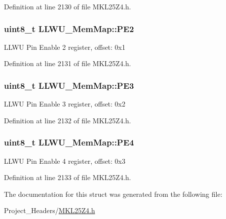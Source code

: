 Definition at line 2130 of file M\+K\+L25\+Z4.\+h.

\subsubsection[{\texorpdfstring{P\+E2}{PE2}}]{\setlength{\rightskip}{0pt plus 5cm}uint8\+\_\+t L\+L\+W\+U\+\_\+\+Mem\+Map\+::\+P\+E2}\hypertarget{struct_l_l_w_u___mem_map_a53d86f5153bce17f9927472da4fade5a}{}\label{struct_l_l_w_u___mem_map_a53d86f5153bce17f9927472da4fade5a}
L\+L\+WU Pin Enable 2 register, offset\+: 0x1 

Definition at line 2131 of file M\+K\+L25\+Z4.\+h.

\subsubsection[{\texorpdfstring{P\+E3}{PE3}}]{\setlength{\rightskip}{0pt plus 5cm}uint8\+\_\+t L\+L\+W\+U\+\_\+\+Mem\+Map\+::\+P\+E3}\hypertarget{struct_l_l_w_u___mem_map_a96a722e1ae66ee87b88407ef622cf243}{}\label{struct_l_l_w_u___mem_map_a96a722e1ae66ee87b88407ef622cf243}
L\+L\+WU Pin Enable 3 register, offset\+: 0x2 

Definition at line 2132 of file M\+K\+L25\+Z4.\+h.

\subsubsection[{\texorpdfstring{P\+E4}{PE4}}]{\setlength{\rightskip}{0pt plus 5cm}uint8\+\_\+t L\+L\+W\+U\+\_\+\+Mem\+Map\+::\+P\+E4}\hypertarget{struct_l_l_w_u___mem_map_a61ec3534039e161c5c71ea7f290f23d5}{}\label{struct_l_l_w_u___mem_map_a61ec3534039e161c5c71ea7f290f23d5}
L\+L\+WU Pin Enable 4 register, offset\+: 0x3 

Definition at line 2133 of file M\+K\+L25\+Z4.\+h.



The documentation for this struct was generated from the following file\+:\begin{DoxyCompactItemize}
\item 
Project\+\_\+\+Headers/\hyperlink{_m_k_l25_z4_8h}{M\+K\+L25\+Z4.\+h}\end{DoxyCompactItemize}

